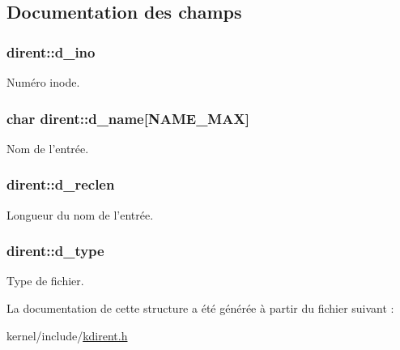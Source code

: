 \subsection{Documentation des champs}
\hypertarget{structdirent_a0ed2e5ea3c71500f628914bf3966e4ba}{
\subsubsection[{d\-\_\-ino}]{ dirent\-::d\-\_\-ino}}\label{structdirent_a0ed2e5ea3c71500f628914bf3966e4ba}
Numéro inode. \hypertarget{structdirent_a7b4cbd53dc600257b2746225c8a8f3be}{
\subsubsection[{d\-\_\-name}]{\setlength{\rightskip}{0pt plus 5cm}char dirent\-::d\-\_\-name\mbox{[}{\bf N\-A\-M\-E\-\_\-\-M\-A\-X}\mbox{]}}}\label{structdirent_a7b4cbd53dc600257b2746225c8a8f3be}
Nom de l'entrée. \hypertarget{structdirent_a7cc67dd4ba5a8bed7f107f249957688d}{
\subsubsection[{d\-\_\-reclen}]{ dirent\-::d\-\_\-reclen}}\label{structdirent_a7cc67dd4ba5a8bed7f107f249957688d}
Longueur du nom de l'entrée. \hypertarget{structdirent_a948760e3b7f607213a19f85e7af15a32}{
\subsubsection[{d\-\_\-type}]{ dirent\-::d\-\_\-type}}\label{structdirent_a948760e3b7f607213a19f85e7af15a32}
Type de fichier. 

La documentation de cette structure a été générée à partir du fichier suivant \-:\begin{DoxyCompactItemize}
\item 
kernel/include/\hyperlink{kdirent_8h}{kdirent.\-h}\end{DoxyCompactItemize}
